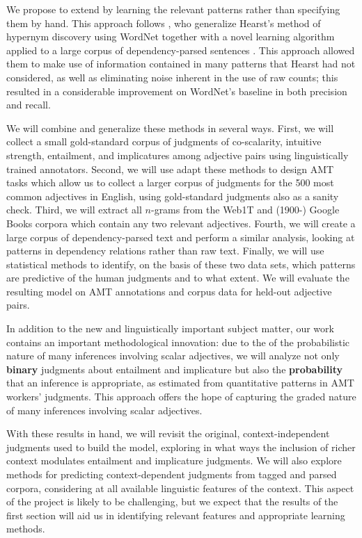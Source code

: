 \documentclass[10pt]{article}
\begin{document}
We propose to extend \cite{sheinmanetal2013} by learning the relevant patterns rather than specifying them by hand. 
This approach follows \cite{snow04,snow2006semantic}, who generalize Hearst's \cite{hearst1992automatic} method of hypernym discovery using WordNet together with a novel learning algorithm applied to a large corpus of dependency-parsed sentences \cite{de2006generating}.
 This approach allowed them to make use of information contained in many patterns that Hearst had not considered, as well as eliminating noise inherent in the use of raw counts; this resulted in a considerable improvement on WordNet's baseline in both precision and recall.

We will combine and generalize these methods in several ways. First, we will collect a small gold-standard corpus of judgments of co-scalarity, intuitive strength, entailment, and implicatures among adjective pairs using linguistically trained annotators. Second, we will use adapt these methods to design AMT tasks which allow us to collect a larger corpus of judgments for the 500 most common adjectives in English, using gold-standard judgments also as a sanity check. Third, we will extract all $n$-grams from the Web1T and (1900-) Google Books corpora which contain any two relevant adjectives. Fourth, we will create a large corpus of dependency-parsed text and perform a similar analysis, looking at patterns in dependency relations rather than raw text. Finally, we will use statistical methods to identify, on the basis of these two data sets, which patterns are predictive of the human judgments and to what extent. We will evaluate the resulting model on AMT annotations and corpus data for held-out adjective pairs. 

In addition to the new and linguistically important subject matter, our work contains an important methodological innovation: due to the of the probabilistic nature of many inferences involving scalar adjectives, we will analyze not only \textbf{binary} judgments about entailment and implicature but also the \textbf{probability} that an inference is appropriate, as estimated from quantitative patterns in AMT workers' judgments. This approach offers the hope of capturing the graded nature of many inferences involving scalar adjectives.

With these results in hand, we will revisit the original, context-independent judgments used to build the model, exploring in what ways the inclusion of richer context modulates entailment and implicature judgments. We will also explore methods for predicting context-dependent judgments from tagged and parsed corpora, considering at all available linguistic features of the context. This aspect of the project is likely to be challenging, but we expect that the results of the first section will aid us in identifying relevant features and appropriate learning methods. 
\end{document}
